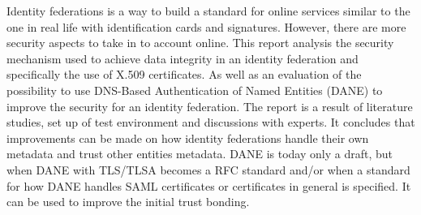Identity federations is a way to build a standard for online services similar to the one in real life with identification cards and signatures.
However, there are more security aspects to take in to account online.
This report analysis the security mechanism used to achieve data integrity in an identity federation and specifically the use of X.509 certificates.
As well as an evaluation of the possibility to use DNS-Based Authentication of Named Entities (DANE) to improve the security for an identity federation.
The report is a result of literature studies, set up of test environment and discussions with experts.
It concludes that improvements can be made on how identity federations handle their own metadata and trust other entities metadata. 
DANE is today only a draft, but when DANE with TLS/TLSA becomes a RFC standard and/or when a standard for how DANE handles SAML certificates or certificates in general is specified.
It can be used to improve the initial trust bonding.






